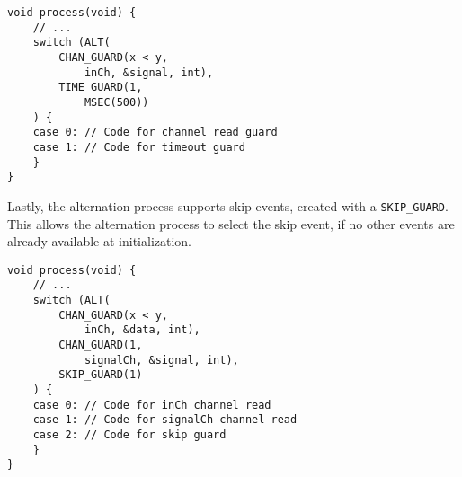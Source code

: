 \begin{lstlisting}[style={CustomC},caption={Alternation construct with timeout}]
void process(void) {
    // ...
    switch (ALT(
        CHAN_GUARD(x < y, 
            inCh, &signal, int),
        TIME_GUARD(1,
            MSEC(500))
    ) {
    case 0: // Code for channel read guard 
    case 1: // Code for timeout guard
    }
}
\end{lstlisting}

Lastly, the alternation process supports skip events, created with a \texttt{SKIP\_GUARD}. This allows the alternation process to select the skip event, if no other events are already available at initialization. 

\begin{lstlisting}[style={CustomC},caption={Alternation construct with timeout}]
void process(void) {
    // ...
    switch (ALT(
        CHAN_GUARD(x < y, 
            inCh, &data, int),
        CHAN_GUARD(1, 
            signalCh, &signal, int),
        SKIP_GUARD(1)
    ) {
    case 0: // Code for inCh channel read 
    case 1: // Code for signalCh channel read
    case 2: // Code for skip guard
    }
}
\end{lstlisting}

